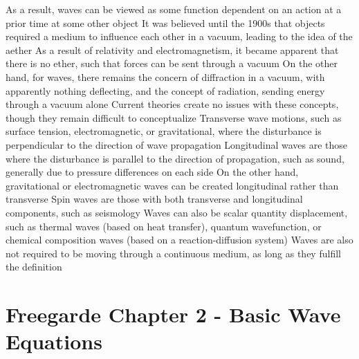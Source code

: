 \documentclass[11 pt, twoside]{article}
\newenvironment{outline*}
{
	\begin{outline}[enumerate]
	}
	{\end{outline}
}
\begin{document}
\begin{outline*}
\2 As a result, waves can be viewed as some function dependent on an action at a prior time at some other object
\1 It was believed until the 1900s that objects required a medium to influence each other in a vacuum, leading to the idea of the aether
\2 As a result of relativity and electromagnetism, it became apparent that there is no ether, such that forces can be sent through a vacuum
\2 On the other hand, for waves, there remains the concern of diffraction in a vacuum, with apparently nothing deflecting, and the concept of radiation, sending energy through a vacuum alone
\3 Current theories create no issues with these concepts, though they remain difficult to conceptualize
\1 Transverse wave motions, such as surface tension, electromagnetic, or gravitational, where the disturbance is perpendicular to the direction of wave propagation
\2 Longitudinal waves are those where the disturbance is parallel to the direction of propagation, such as sound, generally due to pressure differences on each side
\3 On the other hand, gravitational or electromagnetic waves can be created longitudinal rather than transverse
\2 Spin waves are those with both transverse and longitudinal components, such as seismology
\2 Waves can also be scalar quantity displacement, such as thermal waves (based on heat transfer), quantum wavefunction, or chemical composition waves (based on a reaction-diffusion system)
\2 Waves are also not required to be moving through a continuous medium, as long as they fulfill the definition
\end{outline*}
\section{Freegarde Chapter 2 - Basic Wave Equations}
\end{document}
